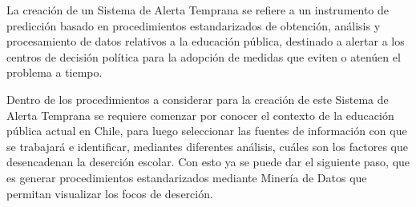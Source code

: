 La creación de un Sistema de Alerta Temprana se refiere a un instrumento de predicción basado en procedimientos estandarizados de obtención, análisis y procesamiento de datos relativos a la educación pública, destinado a alertar a los centros de decisión política para la adopción de medidas que eviten o atenúen el problema a tiempo. 

Dentro de los procedimientos a considerar para la creación de este Sistema de Alerta Temprana se requiere comenzar por conocer el contexto de la educación pública actual en Chile, para luego seleccionar las fuentes de información con que se trabajará e identificar, mediantes diferentes análisis, cuáles son los factores que desencadenan la deserción escolar. Con esto ya se puede dar el siguiente paso, que es generar procedimientos estandarizados mediante Minería de Datos que permitan visualizar los focos de deserción.